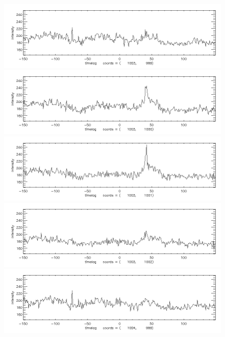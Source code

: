 \documentclass[12pt]{article}
\begin{document}
\begin{figure}[here]
\includegraphics[width=7in]{lc26.png}
\includegraphics[width=7in]{lc27.png}
\includegraphics[width=7in]{lc28.png}
\includegraphics[width=7in]{lc29.png}
\includegraphics[width=7in]{lc30.png}
\end{figure}
\newpage
\end{document}
